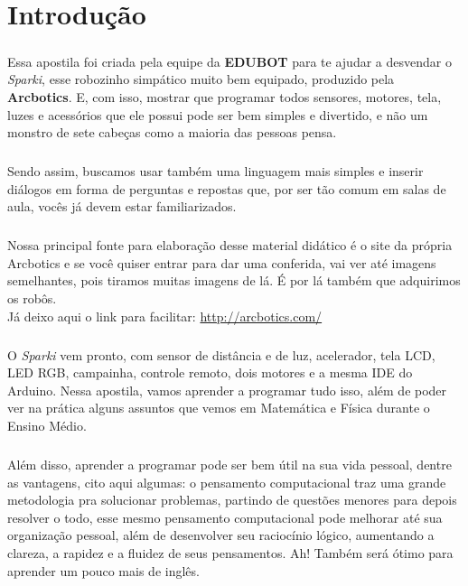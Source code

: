 \chapter*{Introdução}
\justifying
\paragraph{}
Essa apostila foi criada pela equipe da \textbf{EDUBOT} para te ajudar a desvendar o \textit{Sparki}, esse robozinho simpático muito bem equipado, produzido pela \textbf{Arcbotics}. E, com isso, mostrar que programar todos sensores, motores, tela, luzes e acessórios que ele possui pode ser bem simples e divertido, e não um monstro de sete cabeças como a maioria das pessoas pensa.
\paragraph{}
Sendo assim, buscamos usar também uma linguagem mais simples e inserir diálogos em forma de perguntas e repostas que, por ser tão comum em salas de aula, vocês já devem estar familiarizados.
\paragraph{}
Nossa principal fonte para elaboração desse material didático é o site da própria Arcbotics e se você quiser entrar para dar uma conferida, vai ver até imagens semelhantes, pois tiramos muitas imagens de lá. É por lá também que adquirimos os robôs. \\
Já deixo aqui o link para facilitar: \url{http://arcbotics.com/}
\paragraph{}
O \textit{Sparki} vem pronto, com sensor de distância e de luz, acelerador, tela LCD, LED RGB, campainha, controle remoto, dois motores e a mesma IDE do Arduino. Nessa apostila, vamos aprender a programar tudo isso, além de poder ver na prática alguns assuntos que vemos em Matemática e Física durante o Ensino Médio.
\paragraph{}
Além disso, aprender a programar pode ser bem útil na sua vida pessoal, dentre as vantagens, cito aqui algumas:  o pensamento computacional traz uma grande metodologia pra solucionar problemas, partindo de questões menores para depois resolver o todo, esse mesmo pensamento computacional pode melhorar até sua organização pessoal, além de desenvolver seu raciocínio lógico, aumentando a  clareza, a rapidez e a fluidez de seus pensamentos. Ah! Também será ótimo para aprender um pouco mais de inglês.
